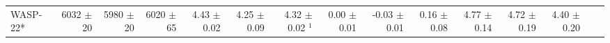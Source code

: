 \begin{sidewaystable*}[t!]
{\begin{tabular}{l r r r r r r r r r r r r r r}
  
  
  WASP-22*  
  &  6032  $\pm$ 20 
& 5980  $\pm$ 20 
&  6020 $\pm$ 65 
&   4.43  $\pm$ 0.02
 & 4.25  $\pm$ 0.09 
 &  4.32  $\pm$ 0.02 $^1$
 &  0.00  $\pm$ 0.01 
 & -0.03  $\pm$ 0.01 
 &  0.16   $\pm$ 0.08
  &  4.77  $\pm$ 0.14
  & 4.72  $\pm$ 0.19
  &  4.40   $\pm$ 0.20  \\


 

\end{tabular}}
\end{sidewaystable*}

